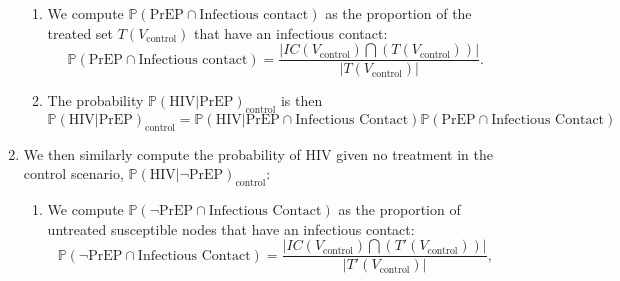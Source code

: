 \documentclass{article}
\theoremstyle{definition}
\begin{document}
\begin{enumerate}
\begin{enumerate}
    \item We compute $\mathbb{P}\left( \text{PrEP} \cap \text{Infectious contact}\right)$ as the proportion of the treated set  $T(V_{\text{control}})$ that have an infectious contact: \begin{equation}
        \mathbb{P}\left( \text{PrEP} \cap \text{Infectious contact}\right)=\frac{\vert IC\left(V_{\text{control}}\right) \bigcap \left({T\left(V_{\text{control}}\right)}\right)\vert}{\vert T\left(V_{\text{control}}\right)\vert}.
    \end{equation}
    \item The probability $\mathbb{P}\left(\text{HIV} \vert \text{PrEP}\right)_{\text{control}}$ is then 
    \begin{equation}
        \mathbb{P}\left(\text{HIV} \vert \text{PrEP}\right)_{\text{control}}=\mathbb{P}\left(\text{HIV} \vert \text{PrEP} \cap \text{Infectious Contact}\right) \mathbb{P}\left(\text{PrEP} \cap \text{Infectious Contact}\right)
    \end{equation}
    \end{enumerate}
    \item We then similarly compute the probability of HIV given no treatment in the control scenario, $\mathbb{P} \left(\text{HIV} \vert \neg \text{PrEP}\right)_{\text{control}}$:
    \begin{enumerate}
    \item We compute $\mathbb{P}\left(\neg \text{PrEP} \cap \text{Infectious Contact} \right)  $ as the proportion of untreated susceptible nodes that have an infectious contact:
    \begin{equation}
        \mathbb{P}\left(\neg \text{PrEP} \cap \text{Infectious Contact} \right)=\frac{\vert IC\left(V_{\text{control}}\right) \bigcap \left({T'\left(V_{\text{control}}\right)}\right)\vert}{\vert T'\left(V_{\text{control}}\right)\vert},
    \end{equation}


\end{enumerate}
\end{enumerate}
\end{document}
